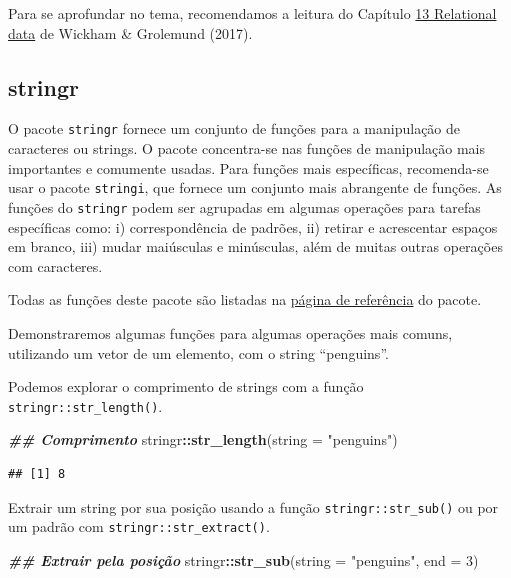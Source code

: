 \documentclass[
]{article}
\newenvironment{Shaded}{\begin{snugshade}}{\end{snugshade}}
\newcommand{\AttributeTok}[1]{\textcolor[rgb]{0.13,0.29,0.53}{#1}}
\newcommand{\DecValTok}[1]{\textcolor[rgb]{0.00,0.00,0.81}{#1}}
\newcommand{\DocumentationTok}[1]{\textcolor[rgb]{0.56,0.35,0.01}{\textbf{\textit{#1}}}}
\newcommand{\FunctionTok}[1]{\textcolor[rgb]{0.13,0.29,0.53}{\textbf{#1}}}
\newcommand{\NormalTok}[1]{#1}
\newcommand{\SpecialCharTok}[1]{\textcolor[rgb]{0.81,0.36,0.00}{\textbf{#1}}}
\newcommand{\StringTok}[1]{\textcolor[rgb]{0.31,0.60,0.02}{#1}}
\begin{document}
Para se aprofundar no tema, recomendamos a leitura do Capítulo \href{https://r4ds.had.co.nz/relational-data.html}{13 Relational data} de Wickham \& Grolemund (2017).

\hypertarget{stringr}{%
\subsection{stringr}\label{stringr}}

O pacote \texttt{stringr} fornece um conjunto de funções para a manipulação de caracteres ou strings. O pacote concentra-se nas funções de manipulação mais importantes e comumente usadas. Para funções mais específicas, recomenda-se usar o pacote \texttt{stringi}, que fornece um conjunto mais abrangente de funções. As funções do \texttt{stringr} podem ser agrupadas em algumas operações para tarefas específicas como: i) correspondência de padrões, ii) retirar e acrescentar espaços em branco, iii) mudar maiúsculas e minúsculas, além de muitas outras operações com caracteres.

Todas as funções deste pacote são listadas na \href{https://stringr.tidyverse.org/reference/index.html}{página de referência} do pacote.

Demonstraremos algumas funções para algumas operações mais comuns, utilizando um vetor de um elemento, com o string ``penguins''.

Podemos explorar o comprimento de strings com a função \texttt{stringr::str\_length()}.

\begin{Shaded}
\begin{Highlighting}[]
\DocumentationTok{\#\# Comprimento}
\NormalTok{stringr}\SpecialCharTok{::}\FunctionTok{str\_length}\NormalTok{(}\AttributeTok{string =} \StringTok{"penguins"}\NormalTok{)}
\end{Highlighting}
\end{Shaded}

\begin{verbatim}
## [1] 8
\end{verbatim}

Extrair um string por sua posição usando a função \texttt{stringr::str\_sub()} ou por um padrão com \texttt{stringr::str\_extract()}.

\begin{Shaded}
\begin{Highlighting}[]
\DocumentationTok{\#\# Extrair pela posição}
\NormalTok{stringr}\SpecialCharTok{::}\FunctionTok{str\_sub}\NormalTok{(}\AttributeTok{string =} \StringTok{"penguins"}\NormalTok{, }\AttributeTok{end =} \DecValTok{3}\NormalTok{)}
\end{Highlighting}
\end{Shaded}
\end{document}
